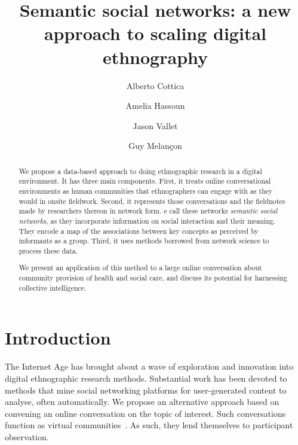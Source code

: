 \documentclass{llncs}
\begin{document}
\title{Semantic social networks: a new approach to scaling digital ethnography}
%
%
\author{Alberto Cottica \and Amelia Hassoun \and Jason Vallet  \and Guy Melan{\c{c}}on}
%
%
%

\maketitle              %

\begin{abstract}
We propose a data-based approach to doing ethnographic research in a digital environment. It has three main components. First, it treats online conversational environments as human communities that ethnographers can engage with as they would in onsite fieldwork. Second, it represents those conversations and the fieldnotes made by researchers thereon in network form. e call these networks \emph{semantic social networks}, as they incorporate information on social interaction and their meaning. They encode a map of the associations between key concepts as perceived by informants as a group.  
Third, it uses methods borrowed from network science to process these data. 

We present an application of this method to a large online conversation about community provision of health and social care, and discuss its potential for harnessing collective intelligence.
\end{abstract}
%
\section{Introduction} \label{sec_introduction}


The Internet Age has brought about a wave of exploration and innovation into digital ethnographic research methods. Substantial work has been devoted to methods that mine social networking platforms for user-generated content to analyse, often automatically.  We propose an alternative approach based on convening an online conversation on the topic of interest. Such conversations function as virtual communities~\cite{Rheingold2000}. As such, they lend themselves to participant observation. 
\end{document}
